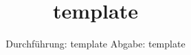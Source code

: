

\subject{vtemplate}
\title{template}
\date{%
  Durchführung: template
  \hspace{3em}
  Abgabe: template
}



\maketitle
\thispagestyle{empty}
\tableofcontents
\newpage






\printbibliography{}

